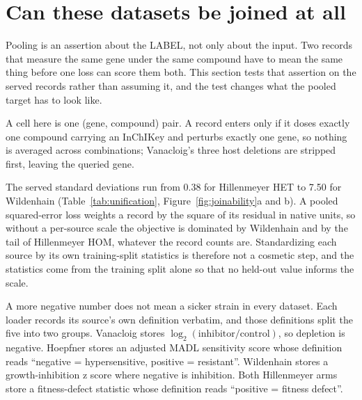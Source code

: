 
\section{Can these datasets be joined at all}
\label{sec:joinability}

Pooling is an assertion about the LABEL, not only about the input. Two records that measure
the same gene under the same compound have to mean the same thing before one loss can score
them both. This section tests that assertion on the served records rather than assuming it,
and the test changes what the pooled target has to look like.

A cell here is one (gene, compound) pair. A record enters only if it doses exactly one
compound carrying an InChIKey and perturbs exactly one gene, so nothing is averaged across
combinations; Vanacloig's three host deletions are stripped first, leaving the queried gene.

\begin{table}[htbp]
\centering
\footnotesize
\caption{What each dataset measures and reports, and the sign its source declares for a sick
strain. The standard deviation and skew are of the served response over its cells. The last
column is the factor the orientation step applies.}
\label{tab:unification}

\end{table}

The served standard deviations run from 0.38 for Hillenmeyer HET to 7.50 for Wildenhain
(Table~\ref{tab:unification}, Figure~\ref{fig:joinability}a and b). A pooled squared-error
loss weights a record by the square of its residual in native units, so without a per-source
scale the objective is dominated by Wildenhain and by the tail of Hillenmeyer HOM, whatever
the record counts are. Standardizing each source by its own training-split statistics is
therefore not a cosmetic step, and the statistics come from the training split alone so that
no held-out value informs the scale.

A more negative number does not mean a sicker strain in every dataset. Each loader records
its source's own definition verbatim, and those definitions split the five into two groups.
Vanacloig stores $\log_2(\text{inhibitor}/\text{control})$, so depletion is negative. Hoepfner
stores an adjusted MADL sensitivity score whose definition reads ``negative = hypersensitive,
positive = resistant''. Wildenhain stores a growth-inhibition z score where negative is
inhibition. Both Hillenmeyer arms store a fitness-defect statistic whose definition reads
``positive = fitness defect''.

